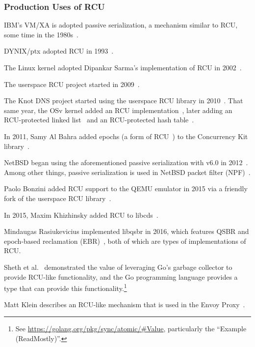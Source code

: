\subsubsection{Production Uses of RCU}
\label{sec:defer:Production Uses of RCU}

IBM's VM/XA is adopted passive serialization, a mechanism similar to
RCU, some time in the 1980s~\cite{Hennessy89}.

DYNIX/ptx adopted RCU in 1993~\cite{McKenney98,Slingwine95}.

The Linux kernel adopted Dipankar Sarma's implementation of RCU in
2002~\cite{Torvalds2.5.43}.

The userspace RCU project started in 2009~\cite{MathieuDesnoyers2009URCU}.

The Knot DNS project started using the userspace RCU
library in 2010~\cite{LubosSlovak2010KnotDNSRCU}.
That same year, the OSv kernel added an RCU
implementation~\cite{AviKivity2013OSvRCU},
later adding an RCU-protected linked list~\cite{AviKivity2013OSvRCUlist}
and an RCU-protected hash table~\cite{AviKivity2013OSvRCUhash}.

In 2011, Samy Al Bahra added epochs
(a form of RCU~\cite{UCAM-CL-TR-579,KeirFraser2007withoutLocks})
to the Concurrency Kit
library~\cite{SamyAlBahra2011ckEpoch}.

NetBSD began using the aforementioned passive serialization with v6.0 in
2012~\cite{NetBSD2012pserialize}.
Among other things, passive serialization is used in
NetBSD packet filter (NPF)~\cite{MindaugasRasiukevicius2014NPFRCU}.

Paolo Bonzini added RCU support to the QEMU emulator in 2015 via a
friendly fork of the userspace RCU
library~\cite{MikeDay2013RCUqemu,PaoloBonzini2013QEMURCU}.

In 2015, Maxim Khizhinsky added RCU to
libcds~\cite{MaxKhiszinsky2015C++RCU}.

Mindaugas Rasiukevicius implemented libqsbr in 2016, which features
QSBR and epoch-based reclamation
(EBR)~\cite{MindaugasRasiukevicius2016libqsbr},
both of which are types of implementations of RCU\@.

Sheth et al.~\cite{HarshalSheth2016goRCU}
demonstrated the value of leveraging Go's garbage
collector to provide RCU-like functionality, and
the Go programming language provides a  type that can
provide this functionality.\footnote{
	See \url{https://golang.org/pkg/sync/atomic/\#Value}, particularly
	the ``Example (ReadMostly)''.}

Matt Klein describes an RCU-like mechanism that is used in the Envoy
Proxy~\cite{MattKlein2017EnvoyRCU}.

